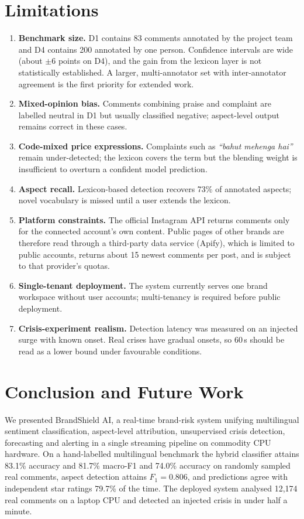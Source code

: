\documentclass[conference]{IEEEtran}
\begin{document}
\section{Limitations}

\begin{enumerate}
\item \textbf{Benchmark size.} D1 contains 83 comments annotated by the project team and
D4 contains 200 annotated by one person. Confidence intervals are wide (about $\pm$6
points on D4), and the gain from the lexicon layer is not statistically established. A larger, multi-annotator set with
inter-annotator agreement is the first priority for extended work.
\item \textbf{Mixed-opinion bias.} Comments combining praise and complaint are labelled
neutral in D1 but usually classified negative; aspect-level output remains correct in
these cases.
\item \textbf{Code-mixed price expressions.} Complaints such as \emph{``bahut mehenga
hai''} remain under-detected; the lexicon covers the term but the blending weight is
insufficient to overturn a confident model prediction.
\item \textbf{Aspect recall.} Lexicon-based detection recovers 73\% of annotated aspects;
novel vocabulary is missed until a user extends the lexicon.
\item \textbf{Platform constraints.} The official Instagram API returns comments only
for the connected account's own content. Public pages of other brands are therefore read
through a third-party data service (Apify), which is limited to public accounts, returns
about 15 newest comments per post, and is subject to that provider's quotas.
\item \textbf{Single-tenant deployment.} The system currently serves one brand workspace
without user accounts; multi-tenancy is required before public deployment.
\item \textbf{Crisis-experiment realism.} Detection latency was measured on an injected
surge with known onset. Real crises have gradual onsets, so 60\,s should be read as a
lower bound under favourable conditions.
\end{enumerate}

\section{Conclusion and Future Work}

We presented BrandShield AI, a real-time brand-risk system unifying multilingual sentiment
classification, aspect-level attribution, unsupervised crisis detection, forecasting and
alerting in a single streaming pipeline on commodity CPU hardware. On a hand-labelled
multilingual benchmark the hybrid classifier attains 83.1\% accuracy and 81.7\% macro-F1
and 74.0\% accuracy on randomly sampled real comments, aspect detection attains
$F_1 = 0.806$, and predictions agree with independent star ratings 79.7\% of the
time. The deployed system analysed 12{,}174 real comments on a laptop CPU and detected an
injected crisis in under half a minute.
\end{document}
